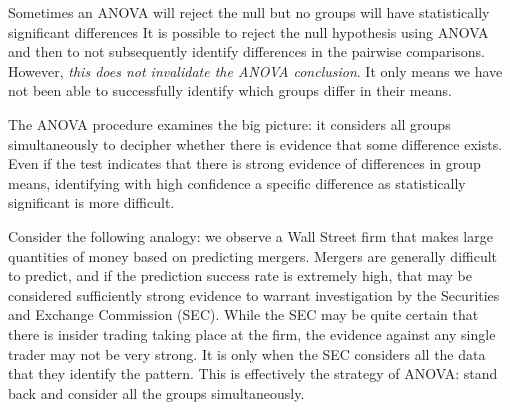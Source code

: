 \begin{caution}
{Sometimes an ANOVA will reject the null but no groups will have statistically significant differences}
{It is possible to reject the null hypothesis using ANOVA and then to not subsequently identify differences in the pairwise comparisons. However, \emph{this does not invalidate the ANOVA conclusion}. It only means we have not been able to successfully identify which groups differ in their means.}
\end{caution}

The ANOVA procedure examines the big picture: it considers all groups simultaneously to decipher whether there is evidence that some difference exists. Even if the test indicates that there is strong evidence of differences in group means, identifying with high confidence a specific difference as statistically significant is more difficult.

Consider the following analogy: we observe a Wall Street firm that makes large quantities of money based on predicting mergers. Mergers are generally difficult to predict, and if the prediction success rate is extremely high, that may be considered sufficiently strong evidence to warrant investigation by the Securities and Exchange Commission (SEC). While the SEC may be quite certain that there is insider trading taking place at the firm, the evidence against any single trader may not be very strong. It is only when the SEC considers all the data that they identify the pattern. This is effectively the strategy of ANOVA: stand back and consider all the groups simultaneously.


